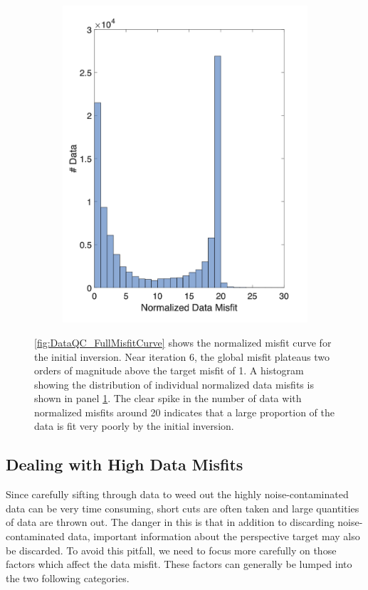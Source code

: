\documentclass[final,authoryear,5p,times,twocolumn]{elsarticle}
\begin{document}
\begin{figure}[!ht]
\begin{subfigure}[b]{0.475\linewidth}
       \includegraphics[trim=0.5cm 0.5cm 1.7cm 1cm, clip=true, width=\linewidth]{./Figures/Fig4b.png}
       \caption{}
       \label{fig:DataQC_FullMisfitHist}
   \end{subfigure}
   \caption{\ref{fig:DataQC_FullMisfitCurve} shows the normalized misfit curve for the initial inversion. Near iteration 6, the global misfit plateaus two orders of magnitude above the target misfit of 1. A histogram showing the distribution of individual normalized data misfits is shown in panel \ref{fig:DataQC_FullMisfitHist}. The clear spike in the number of data with normalized misfits around 20 indicates that a large proportion of the data is fit very poorly by the initial inversion.}
   \label{fig:DataQC_FullMisfit}
\end{figure}

\subsection{Dealing with High Data Misfits}
\label{Dealing_With_High_Misfits}
Since carefully sifting through data to weed out the highly noise-contaminated data can be very time consuming, short cuts are often taken and large quantities of data are thrown out. The danger in this is that in addition to discarding noise-contaminated data, important information about the perspective target may also be discarded. To avoid this pitfall, we need to focus more carefully on those factors which affect the data misfit. These factors can generally be lumped into the two following categories.
\end{document}

